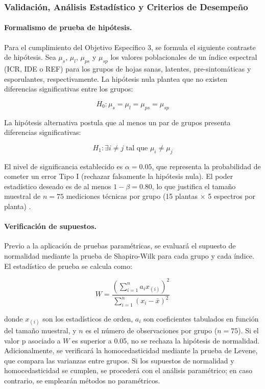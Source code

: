 \documentclass[12pt, a4paper]{article}
\begin{document}
	
	
	\subsubsection{Validación, Análisis Estadístico y Criterios de Desempeño}
	
	\paragraph{Formalismo de prueba de hipótesis.}
	Para el cumplimiento del Objetivo Específico 3, se formula el siguiente contraste de hipótesis. Sea $\mu_s$, $\mu_l$, $\mu_{ps}$ y $\mu_{sp}$ los valores poblacionales de un índice espectral (ICR, IDE o REF) para los grupos de hojas sanas, latentes, pre-sintomáticas y esporulantes, respectivamente. La hipótesis nula plantea que no existen diferencias significativas entre los grupos:
	
	\begin{equation}
		H_0: \mu_s = \mu_l = \mu_{ps} = \mu_{sp}
	\end{equation}
	
	La hipótesis alternativa postula que al menos un par de grupos presenta diferencias significativas:
	
	\begin{equation}
		H_1: \exists i \neq j \text{ tal que } \mu_i \neq \mu_j
	\end{equation}
	
	El nivel de significancia establecido es $\alpha = 0.05$, que representa la probabilidad de cometer un error Tipo I (rechazar falsamente la hipótesis nula). El poder estadístico deseado es de al menos $1-\beta = 0.80$, lo que justifica el tamaño muestral de $n=75$ mediciones técnicas por grupo (15 plantas × 5 espectros por planta) \citep{montgomery2017}.
	
	\paragraph{Verificación de supuestos.}
	Previo a la aplicación de pruebas paramétricas, se evaluará el supuesto de normalidad mediante la prueba de Shapiro-Wilk para cada grupo y cada índice. El estadístico de prueba se calcula como:
	
	\begin{equation}
		W = \frac{\left( \sum_{i=1}^{n} a_i x_{(i)} \right)^2}{\sum_{i=1}^{n} (x_i - \bar{x})^2}
	\end{equation}
	
	donde $x_{(i)}$ son los estadísticos de orden, $a_i$ son coeficientes tabulados en función del tamaño muestral, y $n$ es el número de observaciones por grupo ($n=75$). Si el valor p asociado a $W$ es superior a 0.05, no se rechaza la hipótesis de normalidad. Adicionalmente, se verificará la homocedasticidad mediante la prueba de Levene, que compara las varianzas entre grupos. Si los supuestos de normalidad y homocedasticidad se cumplen, se procederá con el análisis paramétrico; en caso contrario, se emplearán métodos no paramétricos.
	
\end{document}
